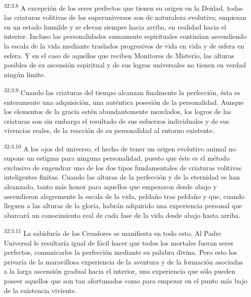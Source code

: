 \par
\textsuperscript{32:3.8} A excepción de los seres perfectos que tienen su origen en la Deidad, todas las criaturas volitivas de los superuniversos son de naturaleza evolutiva; empiezan en un estado humilde y se elevan siempre hacia arriba, en realidad hacia el interior. Incluso las personalidades sumamente espirituales continúan ascendiendo la escala de la vida mediante traslados progresivos de vida en vida y de esfera en esfera. Y en el caso de aquellos que reciben Monitores de Misterio, las alturas posibles de su ascensión espiritual y de sus logros universales no tienen en verdad ningún límite.

\par
\textsuperscript{32:3.9} Cuando las criaturas del tiempo alcanzan finalmente la perfección, ésta es enteramente una adquisición, una auténtica posesión de la personalidad. Aunque los elementos de la gracia estén abundantemente mezclados, los logros de las criaturas son sin embargo el resultado de sus esfuerzos individuales y de sus vivencias reales, de la reacción de su personalidad al entorno existente.

\par
\textsuperscript{32:3.10} A los ojos del universo, el hecho de tener un origen evolutivo animal no supone un estigma para ninguna personalidad, puesto que éste es el método exclusivo de engendrar uno de los dos tipos fundamentales de criaturas volitivas inteligentes finitas. Cuando las alturas de la perfección y de la eternidad se han alcanzado, tanto más honor para aquellos que empezaron desde abajo y ascendieron alegremente la escala de la vida, peldaño tras peldaño y que, cuando lleguen a las alturas de la gloria, habrán adquirido una experiencia personal que abarcará un conocimiento real de cada fase de la vida desde abajo hasta arriba.

\par
\textsuperscript{32:3.11} La sabiduría de los Creadores se manifiesta en todo esto. Al Padre Universal le resultaría igual de fácil hacer que todos los mortales fueran seres perfectos, comunicarles la perfección mediante su palabra divina. Pero esto los privaría de la maravillosa experiencia de la aventura y de la formación asociadas a la larga ascensión gradual hacia el interior, una experiencia que sólo pueden poseer aquellos que son tan afortunados como para empezar en el punto más bajo de la existencia viviente.


